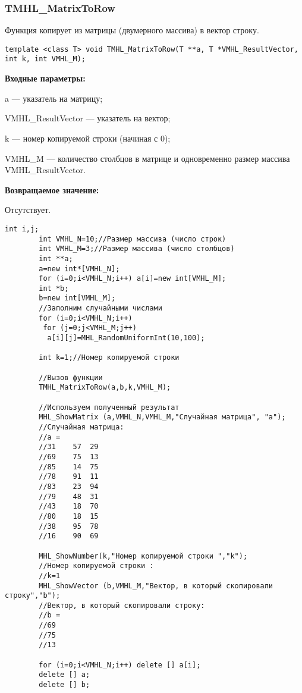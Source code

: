 \documentclass[a4paper,12pt]{article}
\begin{document}
\subsubsection{TMHL\_MatrixToRow}\label{TMHL_MatrixToRow}

Функция копирует из матрицы (двумерного массива) в вектор строку.


\begin{lstlisting}[label=code_syntax_TMHL_MatrixToRow,caption=Синтаксис]
template <class T> void TMHL_MatrixToRow(T **a, T *VMHL_ResultVector, int k, int VMHL_M);
\end{lstlisting}

\textbf{Входные параметры:}  
 
a --- указатель на матрицу;
 
VMHL\_ResultVector --- указатель на вектор;
 
k --- номер копируемой строки (начиная с 0);
 
VMHL\_M --- количество столбцов в матрице и одновременно размер массива VMHL\_ResultVector.

\textbf{Возвращаемое значение:}

Отсутствует.


\begin{lstlisting}[label=code_use_TMHL_MatrixToRow,caption=Пример использования]
        int i,j;
        int VMHL_N=10;//Размер массива (число строк)
        int VMHL_M=3;//Размер массива (число столбцов)
        int **a;
        a=new int*[VMHL_N];
        for (i=0;i<VMHL_N;i++) a[i]=new int[VMHL_M];
        int *b;
        b=new int[VMHL_M];
        //Заполним случайными числами
        for (i=0;i<VMHL_N;i++)
         for (j=0;j<VMHL_M;j++)
          a[i][j]=MHL_RandomUniformInt(10,100);

        int k=1;//Номер копируемой строки
        
        //Вызов функции
        TMHL_MatrixToRow(a,b,k,VMHL_M);

        //Используем полученный результат
        MHL_ShowMatrix (a,VMHL_N,VMHL_M,"Случайная матрица", "a");
        //Случайная матрица:
        //a =	
        //31	57	29
        //69	75	13
        //85	14	75
        //78	91	11
        //83	23	94
        //79	48	31
        //43	18	70
        //80	18	15
        //38	95	78
        //16	90	69
        
        MHL_ShowNumber(k,"Номер копируемой строки ","k");
        //Номер копируемой строки :
        //k=1
        MHL_ShowVector (b,VMHL_M,"Вектор, в который скопировали строку","b");
        //Вектор, в который скопировали строку:
        //b =	
        //69
        //75
        //13
        
        for (i=0;i<VMHL_N;i++) delete [] a[i];
        delete [] a;
        delete [] b;
\end{lstlisting}
\end{document}
